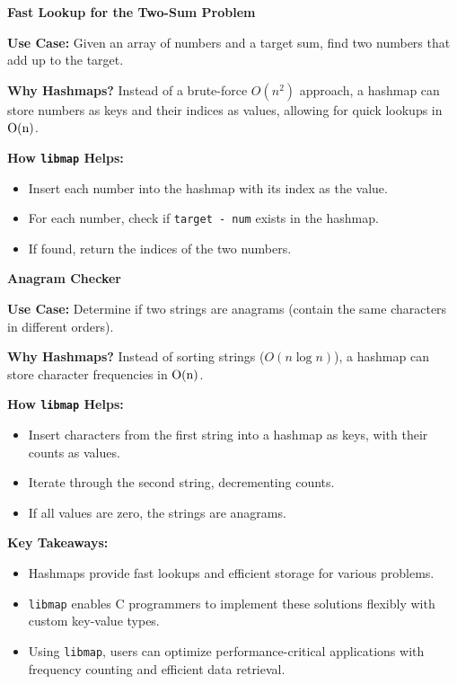 \documentclass[titlepage]{article}
\begin{document}
\bigskip

\textbf{Fast Lookup for the Two-Sum Problem}

\textbf{Use Case:} Given an array of numbers and a target sum, find two numbers that add up to the target.

\textbf{Why Hashmaps?} Instead of a brute-force \(O(n^2)\) approach, a hashmap can store numbers as keys and their indices as values, allowing for quick lookups in \($O(n)$\).

\textbf{How \texttt{libmap} Helps:}
\begin{itemize}
    \item Insert each number into the hashmap with its index as the value.
    \item For each number, check if \texttt{target - num} exists in the hashmap.
    \item If found, return the indices of the two numbers.
\end{itemize}

\bigskip

\textbf{Anagram Checker}

\textbf{Use Case:} Determine if two strings are anagrams (contain the same characters in different orders).

\textbf{Why Hashmaps?} Instead of sorting strings (\(O(n \log n)\)), a hashmap can store character frequencies in \($O(n)$\).

\textbf{How \texttt{libmap} Helps:}
\begin{itemize}
    \item Insert characters from the first string into a hashmap as keys, with their counts as values.
    \item Iterate through the second string, decrementing counts.
    \item If all values are zero, the strings are anagrams.
\end{itemize}

\bigskip

\textbf{Key Takeaways:}
\begin{itemize}
    \item Hashmaps provide fast lookups and efficient storage for various problems.
    \item \texttt{libmap} enables C programmers to implement these solutions flexibly with custom key-value types.
    \item Using \texttt{libmap}, users can optimize performance-critical applications with frequency counting and efficient data retrieval.
\end{itemize}
\end{document}
